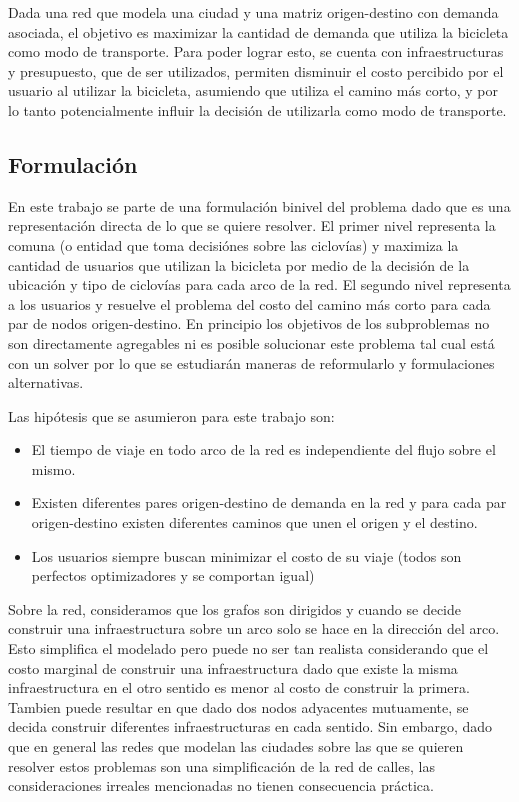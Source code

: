 \documentclass{article}
\begin{document}
  Dada una red que modela una ciudad y una matriz origen-destino con demanda asociada, el objetivo es maximizar la cantidad de demanda que utiliza la bicicleta como modo de transporte. Para poder lograr esto, se cuenta con infraestructuras y presupuesto, que de ser utilizados, permiten disminuir el costo percibido por el usuario al utilizar la bicicleta, asumiendo que utiliza el camino más corto, y por lo tanto potencialmente influir la decisión de utilizarla como modo de transporte.

  \subsection*{Formulación}

  En este trabajo se parte de una formulación binivel del problema dado que es una representación directa de lo que se quiere resolver. El primer nivel representa la comuna (o entidad que toma decisiónes sobre las ciclovías) y maximiza la cantidad de usuarios que utilizan la bicicleta por medio de la decisión de la ubicación y tipo de ciclovías para cada arco de la red. El segundo nivel representa a los usuarios y resuelve el problema del costo del camino más corto para cada par de nodos origen-destino. En principio los objetivos de los subproblemas no son directamente agregables ni es posible solucionar este problema tal cual está con un solver por lo que se estudiarán maneras de reformularlo y formulaciones alternativas.

  Las hipótesis que se asumieron para este trabajo son:

  \begin{itemize}
    \item{El tiempo de viaje en todo arco de la red es independiente del flujo sobre el mismo.}
    \item{Existen diferentes pares origen-destino de demanda en la red y para cada par origen-destino existen diferentes caminos que unen el origen y el destino.}
    \item{Los usuarios siempre buscan minimizar el costo de su viaje (todos son
    perfectos optimizadores y se comportan igual)}
  \end{itemize}

  Sobre la red, consideramos que los grafos son dirigidos y cuando se decide construir una infraestructura sobre un arco solo se hace en la dirección del arco. Esto simplifica el modelado pero puede no ser tan realista considerando que el costo marginal de construir una infraestructura dado que existe la misma infraestructura en el otro sentido es menor al costo de construir la primera. Tambien puede resultar en que dado dos nodos adyacentes mutuamente, se decida construir diferentes infraestructuras en cada sentido. Sin embargo, dado que en general las redes que modelan las ciudades sobre las que se quieren resolver estos problemas son una simplificación de la red de calles, las consideraciones irreales mencionadas no tienen consecuencia práctica.
\end{document}
